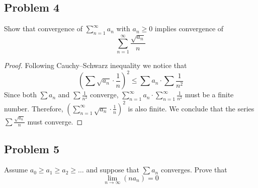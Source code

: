 \documentclass{article}
\theoremstyle{remark}
\begin{document}
\subsection*{Problem 4}

\begin{tcolorbox}
Show that convergence of $\sum_{n=1}^\infty a_n$ with $a_n \geq 0$ implies convergence of 
\[ \sum_{n=1}^\infty \frac{\sqrt{a_n}}{n} \]
\end{tcolorbox}

\begin{proof}

Following Cauchy–Schwarz inequality we notice that
\[ \left( \sum \sqrt{a_n} \cdot \frac{1}{n} \right)^2 \leq \sum a_n \cdot \sum \frac{1}{n^2} \]
Since both $\sum a_n$ and $\sum \frac{1}{n^2}$ converge, $\sum_{n=1}^\infty a_n \cdot \sum_{n=1}^\infty \frac{1}{n^2}$ must be a finite number.
Therefore, $\left( \sum_{n=1}^\infty \sqrt{a_n} \cdot \frac{1}{n} \right) ^ 2$ is also finite.
We conclude that the series $\sum \frac{\sqrt{a_n}}{n}$ must converge.
\end{proof}


\subsection*{Problem 5}

\begin{tcolorbox}
Assume $a_0 \geq a_1 \geq a_2 \geq \dots$ and suppose that $\sum a_n$ converges. Prove that
$$ \lim_{n \to \infty} (n a_n) = 0 $$
\end{tcolorbox}
\end{document}
